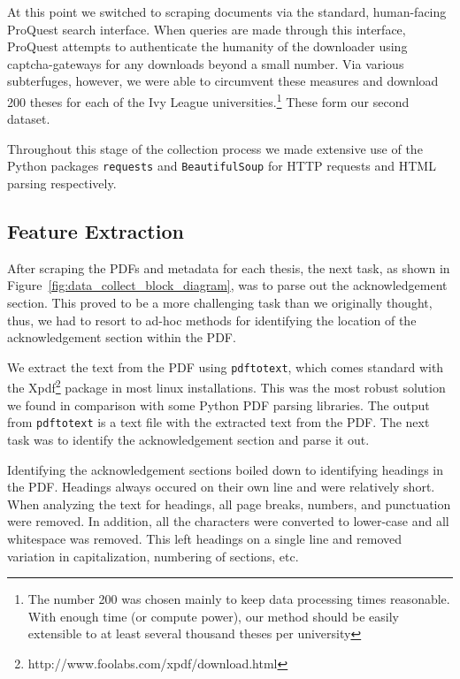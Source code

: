 At this point we switched to scraping documents via the standard, human-facing ProQuest search interface. When queries are made through this interface, ProQuest attempts to authenticate the humanity of the downloader using captcha-gateways for any downloads beyond a small number. Via various subterfuges, however, we were able to circumvent these measures and download 200 theses for each of the Ivy League universities.\footnote{The number 200 was chosen mainly to keep data processing times reasonable. With enough time (or compute power), our method should be easily extensible to at least several thousand theses per university} These form our second dataset.

Throughout this stage of the collection process we made extensive use of the Python packages \texttt{requests} and \texttt{BeautifulSoup} for HTTP requests and HTML parsing respectively.

\subsection*{Feature Extraction}

After scraping the PDFs and metadata for each thesis, the next task, as shown in Figure~\ref{fig:data_collect_block_diagram}, was to parse out the acknowledgement section.  This proved to be a more challenging task than we originally thought, thus, we had to resort to ad-hoc methods for identifying the location of the acknowledgement section within the PDF.

We extract the text from the PDF using \texttt{pdftotext}, which comes standard with the Xpdf\footnote{http://www.foolabs.com/xpdf/download.html} package in most linux installations.  This was the most robust solution we found in comparison with some Python PDF parsing libraries.  The output from \texttt{pdftotext} is a text file with the extracted text from the PDF.  The next task was to identify the acknowledgement section and parse it out.

Identifying the acknowledgement sections boiled down to identifying headings in the PDF.  Headings always occured on their own line and were relatively short.  When analyzing the text for headings, all page breaks, numbers, and punctuation were removed.  In addition, all the characters were converted to lower-case and all whitespace was removed.  This left headings on a single line and removed variation in capitalization, numbering of sections, etc.  

